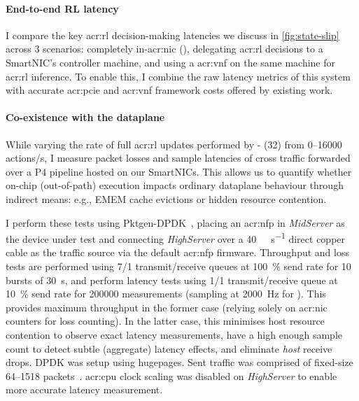 \paragraph{End-to-end RL latency}
I compare the key \gls{acr:rl} decision-making latencies we discuss in \cref{fig:state-slip} across 3 scenarios: completely in-\gls{acr:nic} (\approachshort{}), delegating \gls{acr:rl} decisions to a SmartNIC's controller machine, and using a \gls{acr:vnf} on the same machine for \gls{acr:rl} inference.
To enable this, I combine the raw latency metrics of this system with accurate \gls{acr:pcie} and \gls{acr:vnf} framework costs offered by existing work.

\paragraph{Co-existence with the dataplane}
While varying the rate of full \gls{acr:rl} updates performed by \approachshort{}-\Coopfw{} (\qty{32}{\bit}) from \numrange{0}{16000} actions/s, I measure packet losses and sample latencies of cross traffic forwarded over a P4 pipeline hosted on our SmartNICs.
This allows us to quantify whether on-chip (out-of-path) execution impacts ordinary dataplane behaviour through indirect means: e.g., EMEM cache evictions or hidden resource contention.

I perform these tests using Pktgen-DPDK~\parencite{pktgen-dpdk}, placing an \gls{acr:nfp} in \emph{MidServer} as the device under test and connecting \emph{HighServer} over a \qty{40}{\giga\bit\per\second} direct copper cable as the traffic source via the default \gls{acr:nfp} firmware.
Throughput and loss tests are performed using \num{7}/\num{1} transmit/receive queues at \qty{100}{\percent} send rate for 10 bursts of \qty{30}{\second}, and perform latency tests using \num{1}/\num{1} transmit/receive queue at \qty{10}{\percent} send rate for \num{200000} measurements (sampling at \qty{2000}{\hertz} for ).
This provides maximum throughput in the former case (relying solely on \gls{acr:nic} counters for loss counting).
In the latter case, this minimises host resource contention to observe exact latency measurements, have a high enough sample count to detect subtle (aggregate) latency effects, and eliminate \emph{host} receive drops.
DPDK was setup using  hugepages.
Sent traffic was comprised of fixed-size \qtyrange{64}{1518}{\byte} packets~\parencite{rfc2544}.
\gls{acr:cpu} clock scaling was disabled on \emph{HighServer} to enable more accurate latency measurement.

